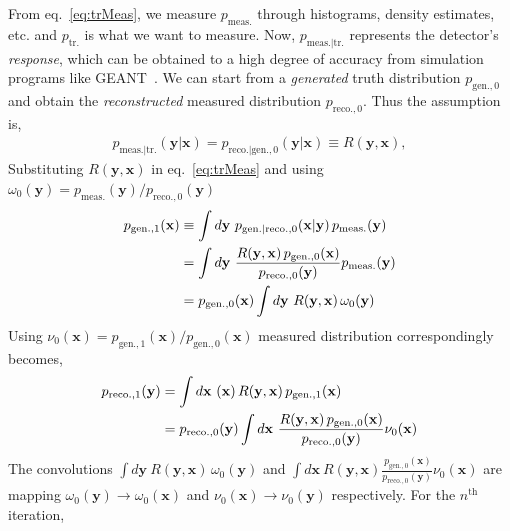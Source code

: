 From eq.~\ref{eq:trMeas}, we measure \(p_\mathrm{meas.}\) through histograms, density estimates, etc. and \(p_\mathrm{tr.}\) is what we want to measure. Now, \(p_\mathrm{meas.|tr.}\) represents the detector's \emph{response}, which can be obtained to a high degree of accuracy from simulation programs like GEANT~\cite{MISC-15}. We can start from a \emph{generated} truth distribution  \(p_\mathrm{gen., 0}\) and obtain the \emph{reconstructed} measured distribution  \(p_\mathrm{reco., 0}\). Thus the assumption is, 
\begin{align}
	\label{eq:responseTransfer}
	p_\mathrm{meas.|tr.}(\mathbf{y} |  \mathbf{x}) = p_\mathrm{reco.|gen., 0}(\mathbf{y} |  \mathbf{x}) \equiv R(\mathbf{y}, \mathbf{x}) ,
\end{align}
Substituting \(R(\mathbf{y}, \mathbf{x})\) in eq.~\ref{eq:trMeas} and using \(\omega_0(\mathbf{y}) = p_\mathrm{meas.}(\mathbf{y})/p_\mathrm{reco., 0}(\mathbf{y})\)
\begin{align}
	\label{eq:unfoldEstimator}
	p_\mathrm{gen., 1}(\mathbf{x}) &\equiv \int d\mathbf{y}~p_\mathrm{gen.|reco., 0}(\mathbf{x} |  \mathbf{y})\,p_\mathrm{meas.}(\mathbf{y}) \notag\\
	&=\int d\mathbf{y}~\frac{R(\mathbf{y}, \mathbf{x})\,p_\mathrm{gen., 0}(\mathbf{x})}{p_\mathrm{reco., 0}(\mathbf{y})} p_\mathrm{meas.}(\mathbf{y})\notag\\
	&= p_\mathrm{gen., 0}(\mathbf{x})\int d\mathbf{y}~R(\mathbf{y}, \mathbf{x})\,\omega_0(\mathbf{y})
\end{align}
Using \(\nu_0(\mathbf{x}) = p_\mathrm{gen., 1}(\mathbf{x})/p_\mathrm{gen., 0}(\mathbf{x})\) measured distribution correspondingly becomes,
\begin{align}
	\label{eq:step2Joint}
	p_\mathrm{reco., 1}(\mathbf{y}) &= \int d\mathbf{x}~(\mathbf{x})\,R(\mathbf{y}, \mathbf{x})\,p_\mathrm{gen., 1}(\mathbf{x})\notag\\
	&= p_\mathrm{reco., 0}(\mathbf{y}) \int d\mathbf{x}~\frac{R(\mathbf{y}, \mathbf{x})\,p_\mathrm{gen., 0}(\mathbf{x})}{p_\mathrm{reco., 0}(\mathbf{y})}\nu_0(\mathbf{x}) 
\end{align}
The convolutions \(\int d\mathbf{y}~R(\mathbf{y}, \mathbf{x})\,\omega_0(\mathbf{y})\) and \(\int d\mathbf{x}~R(\mathbf{y}, \mathbf{x})\frac{\,p_\mathrm{gen., 0}(\mathbf{x})}{p_\mathrm{reco., 0}(\mathbf{y})}\nu_0(\mathbf{x})\) are mapping \(\omega_0(\mathbf{y})\to\omega_0(\mathbf{x})\) and \(\nu_0(\mathbf{x})\to\nu_0(\mathbf{y})\) respectively. 
%
For the \(n^\text{th}\) iteration, 
%
